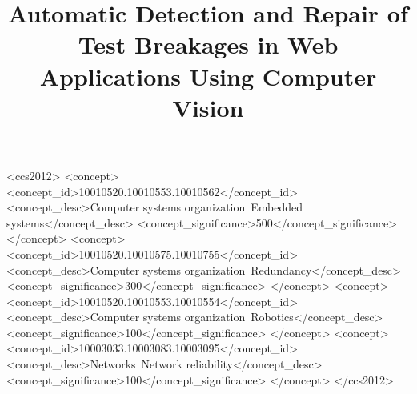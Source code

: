 \documentclass[sigconf,review,anonymous]{acmart}
\begin{document}
\title{Automatic Detection and Repair of Test Breakages in Web Applications Using Computer Vision}



%





\begin{abstract}

\end{abstract}

%
%
\begin{CCSXML}
<ccs2012>
 <concept>
  <concept_id>10010520.10010553.10010562</concept_id>
  <concept_desc>Computer systems organization~Embedded systems</concept_desc>
  <concept_significance>500</concept_significance>
 </concept>
 <concept>
  <concept_id>10010520.10010575.10010755</concept_id>
  <concept_desc>Computer systems organization~Redundancy</concept_desc>
  <concept_significance>300</concept_significance>
 </concept>
 <concept>
  <concept_id>10010520.10010553.10010554</concept_id>
  <concept_desc>Computer systems organization~Robotics</concept_desc>
  <concept_significance>100</concept_significance>
 </concept>
 <concept>
  <concept_id>10003033.10003083.10003095</concept_id>
  <concept_desc>Networks~Network reliability</concept_desc>
  <concept_significance>100</concept_significance>
 </concept>
</ccs2012>  
\end{CCSXML}
\end{document}
